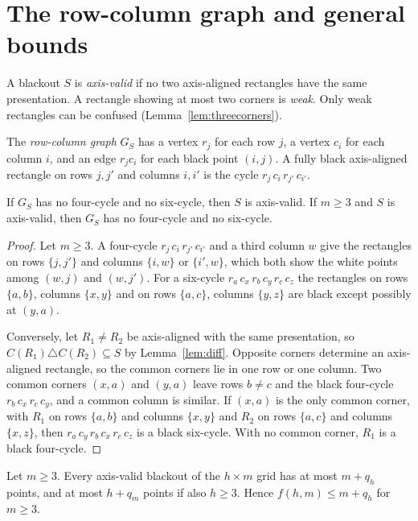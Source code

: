 \section{The row-column graph and general bounds}\label{sec:graph}

A blackout $S$ is \emph{axis-valid} if no two axis-aligned rectangles have the same
presentation. A rectangle showing at most two corners is \emph{weak}. Only weak
rectangles can be confused (Lemma~\ref{lem:threecorners}).

The \emph{row-column graph} $G_S$ has a vertex $r_j$ for each row $j$, a vertex $c_i$ for each column $i$, and an edge $r_jc_i$ for each black point $(i,j)$. A fully black axis-aligned rectangle on rows $j,j'$ and columns $i,i'$ is the cycle $r_j\,c_i\,r_{j'}\,c_{i'}$.

\begin{lemma}\label{lem:girth}
If $G_S$ has no four-cycle and no six-cycle, then $S$ is axis-valid. If $m\ge3$ and $S$ is axis-valid, then $G_S$ has no four-cycle and no six-cycle.
\end{lemma}

\begin{proof}
Let $m\ge3$. A four-cycle $r_j\,c_i\,r_{j'}\,c_{i'}$ and a third column $w$ give the rectangles on rows $\{j,j'\}$ and columns $\{i,w\}$ or $\{i',w\}$, which both show the white points among $(w,j)$ and $(w,j')$. For a six-cycle $r_a\,c_x\,r_b\,c_y\,r_c\,c_z$ the rectangles on rows $\{a,b\}$, columns $\{x,y\}$ and on rows $\{a,c\}$, columns $\{y,z\}$ are black except possibly at $(y,a)$.

Conversely, let $R_1\ne R_2$ be axis-aligned with the same presentation, so $C(R_1)\triangle C(R_2)\subseteq S$ by Lemma~\ref{lem:diff}. Opposite corners determine an axis-aligned rectangle, so the common corners lie in one row or one column. Two common corners $(x,a)$ and $(y,a)$ leave rows $b\ne c$ and the black four-cycle $r_b\,c_x\,r_c\,c_y$, and a common column is similar. If $(x,a)$ is the only common corner, with $R_1$ on rows $\{a,b\}$ and columns $\{x,y\}$ and $R_2$ on rows $\{a,c\}$ and columns $\{x,z\}$, then $r_a\,c_y\,r_b\,c_x\,r_c\,c_z$ is a black six-cycle. With no common corner, $R_1$ is a black four-cycle.
\end{proof}

\begin{theorem}\label{thm:rowbound}
Let $m\ge3$. Every axis-valid blackout of the $h\times m$ grid has at most $m+q_h$ points, and at most $h+q_m$ points if also $h\ge3$. Hence $f(h,m)\le m+q_h$ for $m\ge3$.
\end{theorem}

